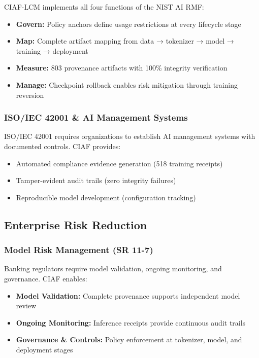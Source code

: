 \documentclass[11pt,a4paper]{article}
\begin{document}
CIAF-LCM implements all four functions of the NIST AI RMF:

\begin{itemize}
    \item \textbf{Govern:} Policy anchors define usage restrictions at every lifecycle stage
    \item \textbf{Map:} Complete artifact mapping from data → tokenizer → model → training → deployment
    \item \textbf{Measure:} 803 provenance artifacts with 100\% integrity verification
    \item \textbf{Manage:} Checkpoint rollback enables risk mitigation through training reversion
\end{itemize}

\subsubsection{ISO/IEC 42001 \& AI Management Systems}

ISO/IEC 42001 requires organizations to establish AI management systems with documented controls. CIAF provides:

\begin{itemize}
    \item Automated compliance evidence generation (518 training receipts)
    \item Tamper-evident audit trails (zero integrity failures)
    \item Reproducible model development (configuration tracking)
\end{itemize}

\subsection{Enterprise Risk Reduction}

\subsubsection{Model Risk Management (SR 11-7)}

Banking regulators require model validation, ongoing monitoring, and governance. CIAF enables:

\begin{itemize}
    \item \textbf{Model Validation:} Complete provenance supports independent model review
    \item \textbf{Ongoing Monitoring:} Inference receipts provide continuous audit trails
    \item \textbf{Governance \& Controls:} Policy enforcement at tokenizer, model, and deployment stages
\end{itemize}
\end{document}
